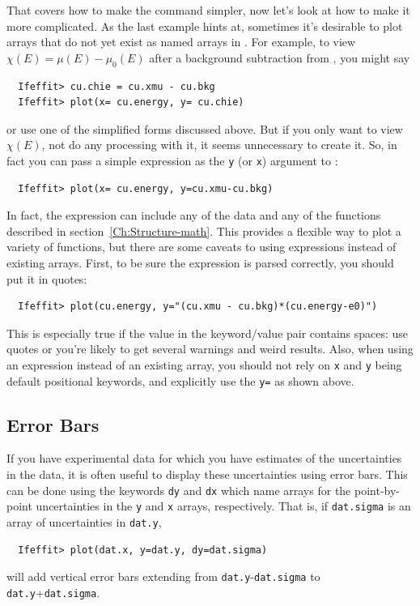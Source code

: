That covers how to make the {} command simpler, now let's look
at how to make it more complicated.  As the last example hints at,
sometimes it's desirable to plot arrays that do not yet exist as named
arrays in {\ifeffit}.  For example, to view $\chi(E) = \mu(E) - \mu_0(E)$
after a background subtraction from {}, you might say
\begin{verbatim}
  Ifeffit> cu.chie = cu.xmu - cu.bkg
  Ifeffit> plot(x= cu.energy, y= cu.chie)
\end{verbatim}
\noindent
or use one of the simplified forms discussed above.  But if you only want
to view $\chi(E)$, not do any processing with it, it seems unnecessary to
create it.  So, in fact you can pass a simple expression as the {\tt{y}}
(or {\tt{x}}) argument to {}:
\begin{verbatim}
  Ifeffit> plot(x= cu.energy, y=cu.xmu-cu.bkg)
\end{verbatim}
\noindent
In fact, the expression can include any of the data and any of the
functions described in section~\ref{Ch:Structure-math}.  This provides a
flexible way to plot a variety of functions, but there are some caveats to
using expressions instead of existing arrays.  First, to be sure the
expression is parsed correctly, you should put it in quotes:
\begin{verbatim}
  Ifeffit> plot(cu.energy, y="(cu.xmu - cu.bkg)*(cu.energy-e0)")
\end{verbatim}
\noindent
This is especially true if the value in the keyword/value pair contains
spaces: use quotes or you're likely to get several warnings and weird
results.  Also, when using an expression instead of an existing array, you
should not rely on {\tt{x}} and {\tt{y}} being default positional keywords,
and explicitly use the {\tt{y=}} as shown above.

\subsection{Error Bars} \label{Ch:Plot-errbars}
{}

If you have experimental data for which you have estimates of the
uncertainties in the data, it is often useful to display these
uncertainties using error bars.  This can be done using the keywords
{\tt{dy}} and {\tt{dx}} which name arrays for the point-by-point
uncertainties in the {\tt{y}} and {\tt{x}} arrays, respectively.  That is,
if {\tt{dat.sigma}} is an array of uncertainties in {\tt{dat.y}},
\begin{verbatim}
  Ifeffit> plot(dat.x, y=dat.y, dy=dat.sigma)
\end{verbatim}
\noindent
will add vertical error bars extending from {\tt{dat.y}}-{\tt{dat.sigma}} to
{\tt{dat.y}}+{\tt{dat.sigma}}.


